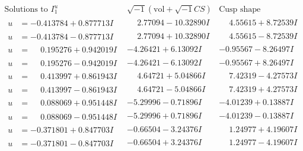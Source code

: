 \documentclass[1p]{elsarticle_modified}
\theoremstyle{definition}
\newcommand{\I}{\sqrt{-1}}
\begin{document}
$$\begin{array}{c|c|c}  
\text{Solutions to }I^u_{1}& \I (\text{vol} + \sqrt{-1}CS) & \text{Cusp shape}\\
 \hline 
\begin{aligned}
u &= -0.413784 + 0.877713 I\end{aligned}
 & \phantom{-}2.77094 - 10.32890 I & \phantom{-}4.55615 + 8.72539 I \\ \hline\begin{aligned}
u &= -0.413784 - 0.877713 I\end{aligned}
 & \phantom{-}2.77094 + 10.32890 I & \phantom{-}4.55615 - 8.72539 I \\ \hline\begin{aligned}
u &= \phantom{-}0.195276 + 0.942019 I\end{aligned}
 & -4.26421 + 6.13092 I & -0.95567 - 8.26497 I \\ \hline\begin{aligned}
u &= \phantom{-}0.195276 - 0.942019 I\end{aligned}
 & -4.26421 - 6.13092 I & -0.95567 + 8.26497 I \\ \hline\begin{aligned}
u &= \phantom{-}0.413997 + 0.861943 I\end{aligned}
 & \phantom{-}4.64721 + 5.04866 I & \phantom{-}7.42319 - 4.27573 I \\ \hline\begin{aligned}
u &= \phantom{-}0.413997 - 0.861943 I\end{aligned}
 & \phantom{-}4.64721 - 5.04866 I & \phantom{-}7.42319 + 4.27573 I \\ \hline\begin{aligned}
u &= \phantom{-}0.088069 + 0.951448 I\end{aligned}
 & -5.29996 - 0.71896 I & -4.01239 + 0.13887 I \\ \hline\begin{aligned}
u &= \phantom{-}0.088069 - 0.951448 I\end{aligned}
 & -5.29996 + 0.71896 I & -4.01239 - 0.13887 I \\ \hline\begin{aligned}
u &= -0.371801 + 0.847703 I\end{aligned}
 & -0.66504 - 3.24376 I & \phantom{-}1.24977 + 4.19607 I \\ \hline\begin{aligned}
u &= -0.371801 - 0.847703 I\end{aligned}
 & -0.66504 + 3.24376 I & \phantom{-}1.24977 - 4.19607 I \\ \hline\begin{aligned}

\end{aligned}
\end{array}$$
\end{document}
